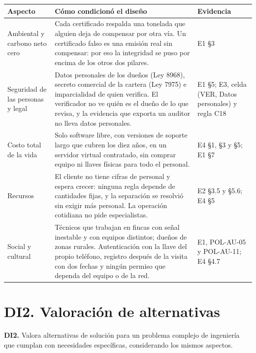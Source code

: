 \documentclass[11pt,letterpaper]{article}
\newcommand{\cab}[1]{\textbf{\rmfamily #1}}
\begin{document}
\begin{center}
\small
\renewcommand{\arraystretch}{1.25}
\begin{tabularx}{\textwidth}{@{}L{3.3cm} Y L{2.9cm}@{}}
\toprule
\cab{Aspecto} & \cab{Cómo condicionó el diseño} & \cab{Evidencia} \\
\midrule
Ambiental y carbono neto cero & Cada certificado respalda una tonelada que alguien deja de compensar por otra vía. Un certificado falso es una emisión real sin compensar: por eso la integridad se puso por encima de los otros dos pilares. & E1 §3 \\
Seguridad de las personas y legal & Datos personales de los dueños (Ley 8968), secreto comercial de la cartera (Ley 7975) e imparcialidad de quien verifica. El verificador no ve quién es el dueño de lo que revisa, y la evidencia que exporta un auditor no lleva datos personales. & E1 §5; E3, celda (VER, Datos personales) y regla C18 \\
Costo total de la vida & Solo software libre, con versiones de soporte largo que cubren los diez años, en un servidor virtual contratado, sin comprar equipo ni llaves físicas para todo el personal. & E4 §1, §3 y §5; E1 §7 \\
Recursos & El cliente no tiene cifras de personal y espera crecer: ninguna regla depende de cantidades fijas, y la separación se resolvió sin exigir más personal. La operación cotidiana no pide especialistas. & E2 §3.5 y §5.6; E4 §5 \\
Social y cultural & Técnicos que trabajan en fincas con señal inestable y con equipos distintos; dueños de zonas rurales. Autenticación con la llave del propio teléfono, registro después de la visita con dos fechas y ningún permiso que dependa del equipo o de la red. & E1, POL-AU-05 y POL-AU-11; E4 §4.7 \\
\bottomrule
\end{tabularx}
\end{center}

\section{DI2. Valoración de alternativas}

\begin{literal}
\textbf{DI2.} Valora alternativas de solución para un problema complejo de ingeniería que cumplan con
necesidades específicas, considerando los mismos aspectos.
\end{literal}
\end{document}
